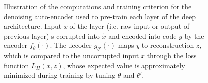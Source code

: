 \documentclass{article} %
\begin{document}
\begin{figure}[ht]
\vspace*{-2mm}
\centerline{}
\vspace*{-2mm}
\caption{Illustration of the computations and training criterion for the denoising
auto-encoder used to pre-train each layer of the deep architecture. Input $x$ of
the layer (i.e. raw input or output of previous layer)
s corrupted into $\tilde{x}$ and encoded into code $y$ by the encoder $f_\theta(\cdot)$.
The decoder $g_{\theta'}(\cdot)$ maps $y$ to reconstruction $z$, which
is compared to the uncorrupted input $x$ through the loss function
$L_H(x,z)$, whose expected value is approximately minimized during training
by tuning $\theta$ and $\theta'$.}
\label{fig:da}
\vspace*{-2mm}
\end{figure}
\end{document}
